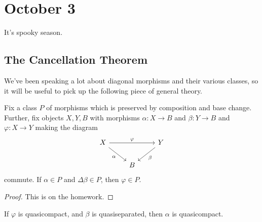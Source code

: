 \documentclass[../notes.tex]{subfiles}
\begin{document}
\section{October 3}

It's spooky season.

\subsection{The Cancellation Theorem}
We've been speaking a lot about diagonal morphisms and their various classes, so it will be useful to pick up the following piece of general theory.
\begin{theorem}
	Fix a class $P$ of morphisms which is preserved by composition and base change. Further, fix objects $X,Y,B$ with morphisms $\alpha\colon X\to B$ and $\beta\colon Y\to B$ and $\varphi\colon X\to Y$ making the diagram
	\[\begin{tikzcd}
		X && Y \\
		& B
		\arrow["\varphi", from=1-1, to=1-3]
		\arrow["\alpha"', from=1-1, to=2-2]
		\arrow["\beta", from=1-3, to=2-2]
	\end{tikzcd}\]
	commute. If $\alpha\in P$ and $\Delta\beta\in P$, then $\varphi\in P$.
\end{theorem}
\begin{proof}
	This is on the homework.
\end{proof}
\begin{example}
	If $\varphi$ is quasicompact, and $\beta$ is quasiseparated, then $\alpha$ is quasicompact.
\end{example}
\end{document}
